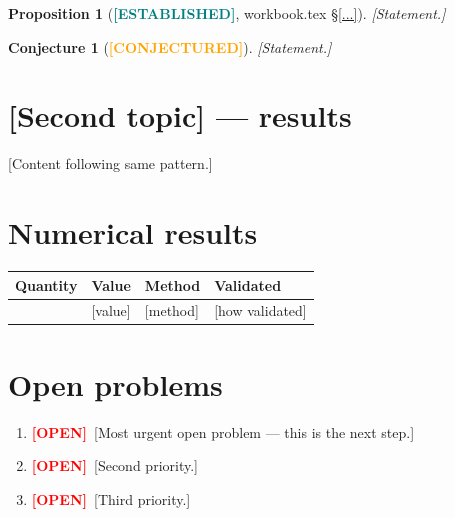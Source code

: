 \documentclass[11pt, a4paper]{article}
\newcommand{\established}{\textcolor{teal}{\textbf{[ESTABLISHED]}}}
\newcommand{\conjectured}{\textcolor{orange}{\textbf{[CONJECTURED]}}}
\newcommand{\open}{\textcolor{red}{\textbf{[OPEN]}}}
\theoremstyle{plain}
\newtheorem{proposition}[theorem]{Proposition}
\newtheorem{conjecture}[theorem]{Conjecture}
\theoremstyle{definition}
\begin{document}
\begin{proposition}[\established, workbook.tex \S\ref{...}]
[Statement.]
\end{proposition}

\begin{conjecture}[\conjectured]
[Statement.]
\end{conjecture}

\section{[Second topic] — results}
\label{sec:topic2results}

[Content following same pattern.]

\section{Numerical results}
\label{sec:numericresults}


\begin{center}
\begin{tabular}{llll}
\toprule
Quantity & Value & Method & Validated \\
\midrule
[quantity] & [value] & [method] & [how validated] \\
\bottomrule
\end{tabular}
\end{center}

\section{Open problems}
\label{sec:open}


\begin{enumerate}[label=\textbf{O\arabic*.}]
  \item \open\ [Most urgent open problem — this is the next step.]
  \item \open\ [Second priority.]
  \item \open\ [Third priority.]
\end{enumerate}
\end{document}
